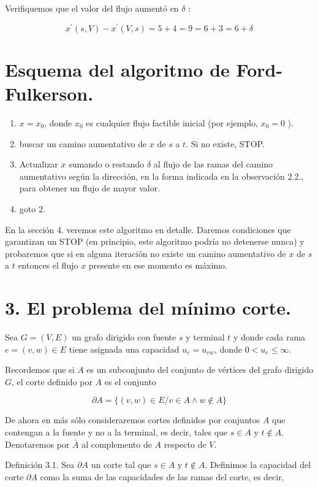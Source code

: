 \documentclass[10pt]{article}
\begin{document}
Verifiquemos que el valor del flujo aumentó en $\delta$ :

$$
x^{\prime}(s, V)-x^{\prime}(V, s)=5+4=9=6+3=6+\delta
$$

\section*{Esquema del algoritmo de Ford-Fulkerson.}
\begin{enumerate}
  \item $x=x_{0}$, donde $x_{0}$ es cualquier flujo factible inicial (por ejemplo, $x_{0}=0$ ).
  \item buscar un camino aumentativo de $x$ de $s$ a $t$. Si no existe, STOP.
  \item Actualizar $x$ sumando o restando $\delta$ al flujo de las ramas del camino aumentativo según la dirección, en la forma indicada en la observación 2.2., para obtener un flujo de mayor valor.
  \item goto 2.
\end{enumerate}

En la sección 4. veremos este algoritmo en detalle. Daremos condiciones que garantizan un STOP (en principio, este algoritmo podría no detenerse nunca) y probaremos que si en alguna iteración no existe un camino aumentativo de $x$ de $s$ a $t$ entonces el flujo $x$ presente en ese momento es máximo.

\section*{3. El problema del mínimo corte.}
Sea $G=(V, E)$ un grafo dirigido con fuente $s$ y terminal $t$ y donde cada rama $e=(v, w) \in E$ tiene asignada una capacidad $u_{e}=u_{v w}$, donde $0<u_{e} \leq \infty$.

Recordemos que si $A$ es un subconjunto del conjunto de vértices del grafo dirigido $G$, el corte definido por $A$ es el conjunto

$$
\partial A=\{(v, w) \in E / v \in A \wedge w \notin A\}
$$

De ahora en más sólo consideraremos cortes definidos por conjuntos $A$ que contengan a la fuente y no a la terminal, es decir, tales que $s \in A$ y $t \notin A$. Denotaremos por $\bar{A}$ al complemento de $A$ respecto de $V$.

Definición 3.1. Sea $\partial A$ un corte tal que $s \in A$ y $t \notin A$. Definimos la capacidad del corte $\partial A$ como la suma de las capacidades de las ramas del corte, es decir,
\end{document}
